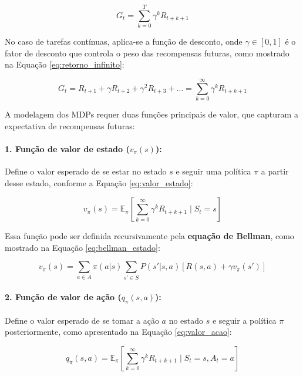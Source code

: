 \begin{equation}
\label{eq:retorno_finito}
G_t = \sum_{k=0}^{T} \gamma^k R_{t+k+1}
\end{equation}

No caso de tarefas contínuas, aplica-se a função de desconto, onde \(\gamma \in [0, 1]\) é o fator de desconto que controla o peso das recompensas futuras, como mostrado na Equação \ref{eq:retorno_infinito}:

\begin{equation}
\label{eq:retorno_infinito}
G_t = R_{t+1} + \gamma R_{t+2} + \gamma^2 R_{t+3} + \dots = \sum_{k=0}^{\infty} \gamma^k R_{t+k+1}
\end{equation}

A modelagem dos MDPs requer duas funções principais de valor, que capturam a expectativa de recompensas futuras:

\paragraph{1. Função de valor de estado (\(v_\pi(s)\)):}
Define o valor esperado de se estar no estado \(s\) e seguir uma política \(\pi\) a partir desse estado, conforme a Equação \ref{eq:valor_estado}:

\begin{equation}
\label{eq:valor_estado}
v_\pi(s) = \mathbb{E}_\pi \left[ \sum_{k=0}^{\infty} \gamma^k R_{t+k+1} \mid S_t = s \right]
\end{equation}

Essa função pode ser definida recursivamente pela \textbf{equação de Bellman}, como mostrado na Equação \ref{eq:bellman_estado}:

\begin{equation}
\label{eq:bellman_estado}
v_\pi(s) = \sum_{a \in A} \pi(a|s) \sum_{s' \in S} P(s'|s, a) \left[ R(s, a) + \gamma v_\pi(s') \right]
\end{equation}

\paragraph{2. Função de valor de ação (\(q_\pi(s, a)\)):}
Define o valor esperado de se tomar a ação \(a\) no estado \(s\) e seguir a política \(\pi\) posteriormente, como apresentado na Equação \ref{eq:valor_acao}:

\begin{equation}
\label{eq:valor_acao}
q_\pi(s, a) = \mathbb{E}_\pi \left[ \sum_{k=0}^{\infty} \gamma^k R_{t+k+1} \mid S_t = s, A_t = a \right]
\end{equation}

